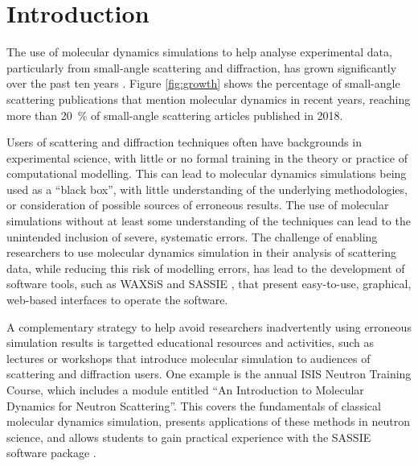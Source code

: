 \documentclass[amsmath,amssymb,twocolumn,superscriptaddress]{revtex4-1}
\begin{document}
\maketitle                        %

\section{Introduction}

\noindent The use of molecular dynamics simulations to help analyse experimental data, particularly from small-angle scattering and diffraction, has grown significantly over the past ten years \cite{pan_molecular_2012,boldon_review_2015,hub_interpreting_2018,ivanovic_temperature-dependent_2018,east_structural_2016,wall_conformational_2014,wall_internal_2018,satoh_multiple_2015}.
Figure \ref{fig:growth} shows the percentage of small-angle scattering publications that mention molecular dynamics in recent years, reaching more than \SI{20}{\percent} of small-angle scattering articles published in 2018.

Users of scattering and diffraction techniques often have backgrounds in experimental science, with little or no formal training in the theory or practice of computational modelling.
This can lead to molecular dynamics simulations being used as a ``black box'', with little understanding of the underlying methodologies, or consideration of possible sources of erroneous results.
The use of molecular simulations without at least some understanding of the techniques can lead to the unintended inclusion of severe, systematic errors.
The challenge of enabling researchers to use molecular dynamics simulation in their analysis of scattering data, while reducing this risk of modelling errors, has lead to the development of software tools, such as WAXSiS and SASSIE \cite{chen_validating_2014,knight_waxsis_2015,perkins_atomistic_2016}, that present easy-to-use, graphical, web-based interfaces to operate the software.

A complementary strategy to help avoid researchers inadvertently using erroneous simulation results is targetted educational resources and activities, such as lectures or workshops that introduce molecular simulation to audiences of scattering and diffraction users.
One example is the annual ISIS Neutron Training Course, which includes a module entitled ``An Introduction to Molecular Dynamics for Neutron Scattering''.
This covers the fundamentals of classical molecular dynamics simulation, presents applications of these methods in neutron science, and allows students to gain practical experience with the SASSIE software package \cite{perkins_atomistic_2016}.
\end{document}

